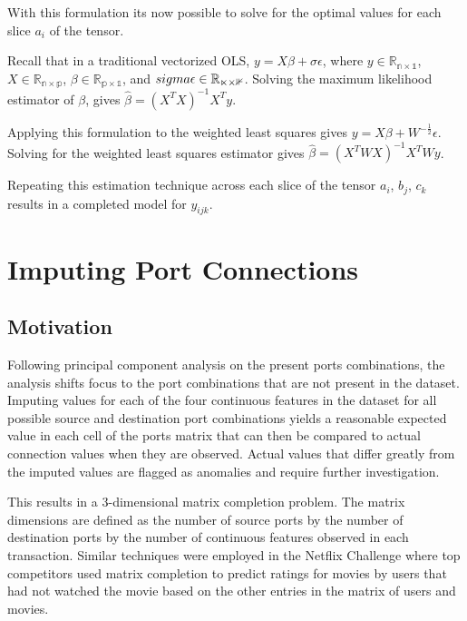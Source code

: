 \documentclass[12pt,twoside]{dukestatscithesis}
\theoremstyle{definition}
\theoremstyle{definition}
\theoremstyle{definition}
\theoremstyle{remark}
\begin{document}
With this formulation its now possible to solve for the optimal values
for each slice \(a_i\) of the tensor.

Recall that in a traditional vectorized OLS,
\(y = X\beta + \sigma\epsilon\), where
\(y \in \mathbb{R_{n \times 1}}\), \(X \in \mathbb{R_{n \times p}}\),
\(\beta \in \mathbb{R_{p \times 1}}\), and
\(\\sigma\epsilon \in \mathbb{R_{n \times 1}}\). Solving the maximum
likelihood estimator of \(\beta\), gives
\(\hat \beta = (X^TX)^{-1}X^Ty\).

Applying this formulation to the weighted least squares gives
\(y = X\beta + W^{-\frac{1}{2}}\epsilon\). Solving for the weighted
least squares estimator gives \(\hat \beta = (X^TWX)^{-1}X^TWy\).

Repeating this estimation technique across each slice of the tensor
\(a_i\), \(b_j\), \(c_k\) results in a completed model for \(y_{ijk}\).

\chapter{Imputing Port Connections}\label{imputing-port-connections}

\section{Motivation}\label{motivation-2}

Following principal component analysis on the present ports
combinations, the analysis shifts focus to the port combinations that
are not present in the dataset. Imputing values for each of the four
continuous features in the dataset for all possible source and
destination port combinations yields a reasonable expected value in each
cell of the ports matrix that can then be compared to actual connection
values when they are observed. Actual values that differ greatly from
the imputed values are flagged as anomalies and require further
investigation.

This results in a 3-dimensional matrix completion problem. The matrix
dimensions are defined as the number of source ports by the number of
destination ports by the number of continuous features observed in each
transaction. Similar techniques were employed in the Netflix Challenge
where top competitors used matrix completion to predict ratings for
movies by users that had not watched the movie based on the other
entries in the matrix of users and movies.
\end{document}
